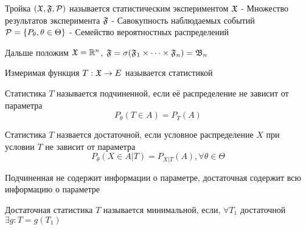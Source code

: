 \documentclass[main.tex]{subfiles}
\begin{document}
\begin{definition}
	Тройка $(\mathfrak{X},\mathfrak{F},\mathcal{P})$ называется статистическим экспериментом\newline
	$\mathfrak{X}$ - Множество результатов эксперимента\newline
	$\mathfrak{F}$ - Савокупность наблюдаемых событий\newline
	$\mathcal{P}=\{P_\theta, \theta \in \Theta\}$ - Семейство вероятностных распределений
\end{definition}
Дальше положим $\mathfrak{X}=\mathbb{R}^n$, $\mathfrak{F}=\sigma(\mathfrak{F}_1 \times \dots \times \mathfrak{F}_n)=\mathfrak{B}_n$

\begin{definition}[Статистика]
	Измеримая функция $T:\mathfrak{X} \rightarrow E$ называется статистикой
\end{definition}

\begin{definition}
	Статистика $T$ называется подчиненной, если её распределение не зависит от параметра
	$$P_\theta (T\in A) = P_T(A)$$
\end{definition}

\begin{definition}
	Статистика $T$ назвается достаточной, если условное распределение $X$ при условии $T$ не зависит от параметра
	$$P_\theta(X\in A|T) = P_{X|T}(A),\forall \theta \in \Theta $$
\end{definition}

Подчиненная не содержит информации о параметре, достаточная содержит всю информацию о параметре

\begin{definition}
	Достаточная статистика $T$ называется минимальной, если, $\forall T_1$ достаточной ${\exists g : T=g(T_1)}$
\end{definition}
\end{document}
